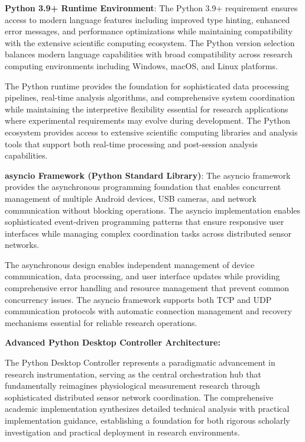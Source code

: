 \documentclass[12pt,a4paper]{report}
\begin{document}
\textbf{Python 3.9+ Runtime Environment}: The Python 3.9+ requirement ensures access to modern language features including
improved type hinting, enhanced error messages, and performance optimizations while maintaining compatibility with the
extensive scientific computing ecosystem. The Python version selection balances modern language capabilities with broad
compatibility across research computing environments including Windows, macOS, and Linux platforms.

The Python runtime provides the foundation for sophisticated data processing pipelines, real-time analysis algorithms,
and comprehensive system coordination while maintaining the interpretive flexibility essential for research applications
where experimental requirements may evolve during development. The Python ecosystem provides access to extensive
scientific computing libraries and analysis tools that support both real-time processing and post-session analysis
capabilities.

\textbf{asyncio Framework (Python Standard Library)}: The asyncio framework provides the asynchronous programming foundation
that enables concurrent management of multiple Android devices, USB cameras, and network communication without blocking
operations. The asyncio implementation enables sophisticated event-driven programming patterns that ensure responsive
user interfaces while managing complex coordination tasks across distributed sensor networks.

The asynchronous design enables independent management of device communication, data processing, and user interface
updates while providing comprehensive error handling and resource management that prevent common concurrency issues. The
asyncio framework supports both TCP and UDP communication protocols with automatic connection management and recovery
mechanisms essential for reliable research operations.

\textbf{Advanced Python Desktop Controller Architecture:}

The Python Desktop Controller represents a paradigmatic advancement in research instrumentation, serving as the central
orchestration hub that fundamentally reimagines physiological measurement research through sophisticated distributed
sensor network coordination. The comprehensive academic implementation synthesizes detailed technical analysis with
practical implementation guidance, establishing a foundation for both rigorous scholarly investigation and practical
deployment in research environments.
\end{document}
